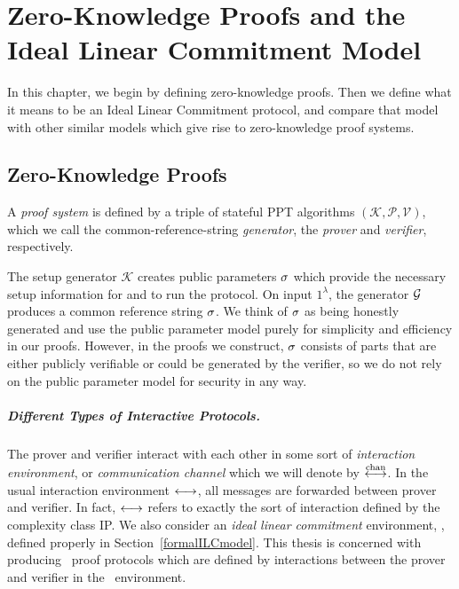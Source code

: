 \chapter{Zero-Knowledge Proofs and the Ideal Linear Commitment Model}
\label{chapterlabel:Models}

In this chapter, we begin by defining zero-knowledge proofs. Then we define what it means to be an Ideal Linear Commitment protocol, and compare that model with other similar models which give rise to zero-knowledge proof systems.

\section{Zero-Knowledge Proofs}
\label{shvzkdef}

A \emph{proof system} is defined by a triple of stateful PPT algorithms $(\mathcal{K},\mathcal{P},\mathcal{V})$, which we call the common-reference-string \emph{generator}, the \emph{prover} and \emph{verifier}, respectively.

The setup generator $\mathcal{K}$ creates public parameters $\mathsf{\sigma}$ which provide the necessary setup information for \prover and \verifier to run the protocol. On input $1^\lambda$, the generator $\mathcal{G}$ produces a common reference string $\mathsf{\sigma}$. We think of $\mathsf{\sigma}$ as being honestly generated and use the public parameter model purely for simplicity and efficiency in our proofs. However, in the proofs we construct, $\mathsf{\sigma}$ consists of parts that are either publicly verifiable or could be generated by the verifier, so we do not rely on the public parameter model for security in any way.

\paragraph{Different Types of Interactive Protocols.} The prover and verifier interact with each other in some sort of \emph{interaction environment}, or \emph{communication channel} which we will denote by $\overset{\textnormal{chan}}{\longleftrightarrow}$. In the usual interaction environment $\longleftrightarrow$, all messages are forwarded between prover and verifier. In fact, $\longleftrightarrow$ refers to exactly the sort of interaction defined by the complexity class IP. We also consider an \emph{ideal linear commitment} environment, \ILC, defined properly in Section~\ref{formalILCmodel}. This thesis is concerned with producing \ILC\ proof protocols which are defined by interactions between the prover and verifier in the \ILC\ environment.

